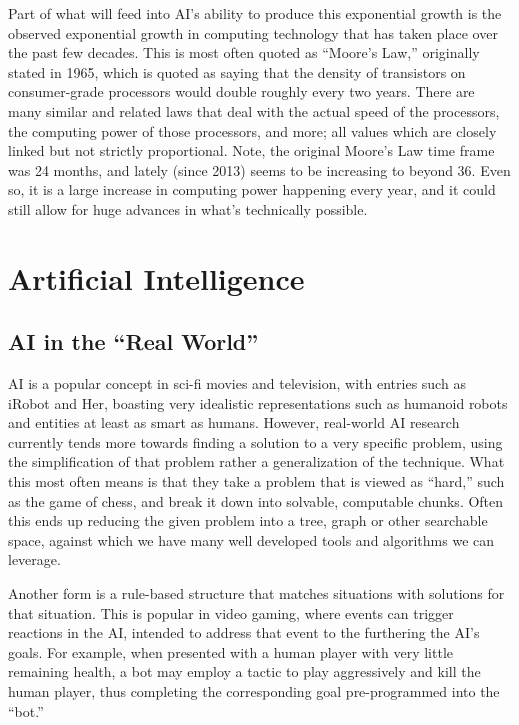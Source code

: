 \documentclass[12pt]{article} %
\begin{document}
Part of what will feed into AI's ability to produce this exponential growth is the observed exponential growth in computing technology that has taken place over the past few decades. This is most often quoted as ``Moore's Law,'' originally stated in 1965, which is quoted as saying that the density of transistors on consumer-grade processors would double roughly every two years. There are many similar and related laws that deal with the actual speed of the processors, the computing power of those processors, and more; all values which are closely linked but not strictly proportional. Note, the original Moore's Law time frame was 24 months, and lately (since 2013)\cite{mooresslowing} seems to be increasing to beyond 36. Even so, it is a large increase in computing power happening every year, and it could still allow for huge advances in what's technically possible.


\section{Artificial Intelligence} %


\subsection{AI in the ``Real World''}

AI is a popular concept in sci-fi movies and television, with entries such as iRobot and Her, boasting very idealistic representations such as humanoid robots and entities at least as smart as humans. However, real-world AI research currently tends more towards finding a solution to a very specific problem, using the simplification of that problem rather a generalization of the technique. What this most often means is that they take a problem that is viewed as ``hard,'' such as the game of chess, and break it down into solvable, computable chunks. Often this ends up reducing the given problem into a tree, graph or other searchable space, against which we have many well developed tools and algorithms we can leverage.

Another form is a rule-based structure that matches situations with solutions for that situation. This is popular in video gaming, where events can trigger reactions in the AI, intended to address that event to the furthering the AI's goals. For example, when presented with a human player with very little remaining health, a bot may employ a tactic to play aggressively and kill the human player, thus completing the corresponding goal pre-programmed into the ``bot.''
\end{document}

